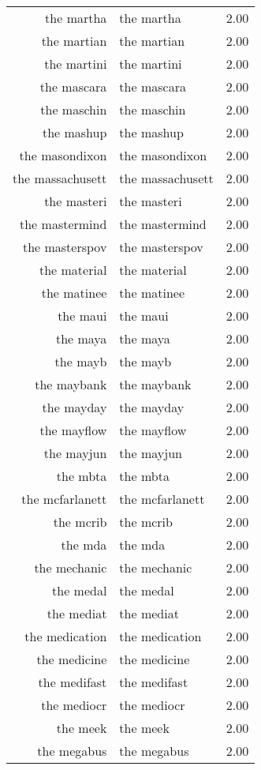 \begin{table}[ht]
\begin{tabular}{rlr}
  the martha & the martha & 2.00 \\ 
  the martian & the martian & 2.00 \\ 
  the martini & the martini & 2.00 \\ 
  the mascara & the mascara & 2.00 \\ 
  the maschin & the maschin & 2.00 \\ 
  the mashup & the mashup & 2.00 \\ 
  the masondixon & the masondixon & 2.00 \\ 
  the massachusett & the massachusett & 2.00 \\ 
  the masteri & the masteri & 2.00 \\ 
  the mastermind & the mastermind & 2.00 \\ 
  the masterspov & the masterspov & 2.00 \\ 
  the material & the material & 2.00 \\ 
  the matinee & the matinee & 2.00 \\ 
  the maui & the maui & 2.00 \\ 
  the maya & the maya & 2.00 \\ 
  the mayb & the mayb & 2.00 \\ 
  the maybank & the maybank & 2.00 \\ 
  the mayday & the mayday & 2.00 \\ 
  the mayflow & the mayflow & 2.00 \\ 
  the mayjun & the mayjun & 2.00 \\ 
  the mbta & the mbta & 2.00 \\ 
  the mcfarlanett & the mcfarlanett & 2.00 \\ 
  the mcrib & the mcrib & 2.00 \\ 
  the mda & the mda & 2.00 \\ 
  the mechanic & the mechanic & 2.00 \\ 
  the medal & the medal & 2.00 \\ 
  the mediat & the mediat & 2.00 \\ 
  the medication & the medication & 2.00 \\ 
  the medicine & the medicine & 2.00 \\ 
  the medifast & the medifast & 2.00 \\ 
  the mediocr & the mediocr & 2.00 \\ 
  the meek & the meek & 2.00 \\ 
  the megabus & the megabus & 2.00 \\ 

\end{tabular}
\end{table}
